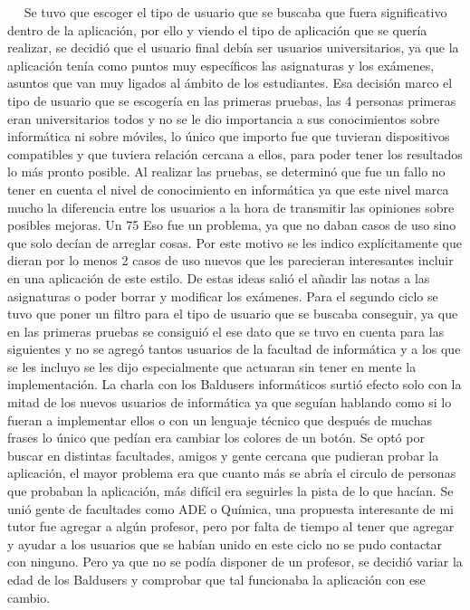  
Se tuvo que escoger el tipo de usuario que se buscaba que fuera significativo dentro de la aplicación, por ello y viendo el tipo de aplicación que se quería realizar, se decidió que el usuario final debía ser usuarios universitarios, ya que la aplicación tenía como puntos muy específicos las asignaturas y los exámenes, asuntos que van muy ligados al ámbito de los estudiantes.
Esa decisión marco el tipo de usuario que se escogería en las primeras pruebas, las 4 personas primeras eran universitarios todos y no se le dio importancia a sus conocimientos sobre informática ni sobre móviles, lo único que importo fue que tuvieran dispositivos compatibles y que tuviera relación cercana a ellos, para poder tener los resultados lo más pronto posible.
Al realizar las pruebas, se determinó que fue un fallo no tener en cuenta el nivel de conocimiento en informática ya que  este nivel marca mucho la diferencia entre los usuarios a la hora de transmitir las opiniones sobre posibles mejoras.
Un 75%
Eso fue un problema, ya que no daban casos de uso sino que solo decían de arreglar cosas. Por este motivo se les indico explícitamente  que dieran por lo menos 2 casos de uso nuevos que les parecieran interesantes incluir en una aplicación de este estilo.
De estas ideas salió el añadir las notas a las asignaturas o poder borrar y modificar los exámenes.
Para el segundo ciclo se tuvo que poner un filtro para el tipo de usuario que se buscaba conseguir, ya que en las primeras pruebas se consiguió el ese dato que se tuvo en cuenta para las siguientes y no se agregó tantos usuarios de la facultad de informática y a los que se les incluyo se les dijo especialmente que actuaran sin tener en mente la implementación.
La charla con los Baldusers informáticos surtió efecto solo con la mitad de los nuevos usuarios de informática ya que seguían hablando como si lo fueran a implementar ellos o con un lenguaje técnico que después de muchas frases lo único que pedían era cambiar los colores de un botón. 
Se optó por buscar en distintas facultades, amigos y gente cercana que pudieran probar la aplicación, el mayor problema era que cuanto más se abría el circulo de personas que probaban la aplicación, más difícil era seguirles la pista de lo que hacían. 
Se unió gente de facultades como ADE o Química, una propuesta interesante de mi tutor fue agregar a algún profesor, pero por falta de tiempo al tener que agregar y ayudar a los usuarios que se habían unido en este ciclo no se pudo contactar con ninguno.
Pero ya que no se podía disponer de un profesor, se decidió variar la edad de los Baldusers y comprobar que tal funcionaba la aplicación con ese cambio.




